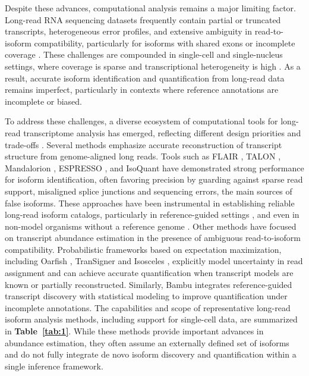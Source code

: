 Despite these advances, computational analysis remains a major limiting factor. Long-read RNA sequencing datasets frequently contain partial or truncated transcripts, heterogeneous error profiles, and extensive ambiguity in read-to-isoform compatibility, particularly for isoforms with shared exons or incomplete coverage \citep{amarasinghe2020, tardaguila2018}. These challenges are compounded in single-cell and single-nucleus settings, where coverage is sparse and transcriptional heterogeneity is high \citep{hardwick2022, gupta2018}. As a result, accurate isoform identification and quantification from long-read data remains imperfect, particularly in contexts where reference annotations are incomplete or biased.

To address these challenges, a diverse ecosystem of computational tools for long-read transcriptome analysis has emerged, reflecting different design priorities and trade-offs \citep{amarasinghe2020}. Several methods emphasize accurate reconstruction of transcript structure from genome-aligned long reads. Tools such as FLAIR \citep{tang2020}, TALON \citep{wyman2019}, Mandalorion \citep{volden2023}, ESPRESSO \citep{gao2023}, and IsoQuant \citep{prjibelski2023} have demonstrated strong performance for isoform identification, often favoring precision by guarding against sparse read support, misaligned splice junctions and sequencing errors, the main sources of false isoforms. These approaches have been instrumental in establishing reliable long-read isoform catalogs, particularly in reference-guided settings \citep{reese2023, workman2019, glinos2022}, and even in non-model organisms without a reference genome \citep{workman2018}. Other methods have focused on transcript abundance estimation in the presence of ambiguous read-to-isoform compatibility. Probabilistic frameworks based on expectation maximization, including Oarfish \citep{zarejousheghani2025}, TranSigner \citep{ji2025} and Isosceles \citep{kabza2024}, explicitly model uncertainty in read assignment and can achieve accurate quantification when transcript models are known or partially reconstructed. Similarly, Bambu \citep{chen2023} integrates reference-guided transcript discovery with statistical modeling to improve quantification under incomplete annotations. The capabilities and scope of representative long-read isoform analysis methods, including support for single-cell data, are summarized in \textbf{Table~\ref{tab:1}}. While these methods provide important advances in abundance estimation, they often assume an externally defined set of isoforms and do not fully integrate de novo isoform discovery and quantification within a single inference framework.

